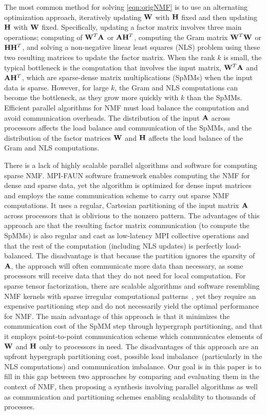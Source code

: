 The most common method for solving \cref{eqn:origNMF} is to use an alternating optimization approach, iteratively updating $\WW$ with $\HH$ fixed and then updating $\HH$ with $\WW$ fixed.
Specifically, updating a factor matrix involves three main operations; computing of $\WW^T\AA$ or $\AA\Hm^T$, computing the Gram matrix $\Wm^T \Wm$ or $\Hm \Hm^T$, and solving a non-negative linear least squares (NLS) problem using these two resulting matrices to update the factor matrix.
When the rank $k$ is small, the typical bottleneck is the computation that involves the input matrix, $\WW^T\AA$ and $\AA\Hm^T$, which are sparse-dense matrix multiplications (SpMMs) when the input data is sparse.
However, for large $k$, the Gram and NLS computations can become the bottleneck, as they grow more quickly with $k$ than the SpMMs.
Efficient parallel algorithms for NMF must load balance the computation and avoid communication overheads.
The distribution of the input $\AA$ across processors affects the load balance and communication of the SpMMs, and the distribution of the factor matrices $\WW$ and $\HH$ affects the load balance of the Gram and NLS computations.

There is a lack of highly scalable parallel algorithms and software for computing sparse NMF.
MPI-FAUN \cite{KBP17} software framework enables computing the NMF for dense and sparse data, yet the algorithm is optimized for dense input matrices and employs the same communication scheme to carry out sparse NMF computations.
It uses a regular, Cartesian partitioning of the input matrix $\AA$ across processors that is oblivious to the nonzero pattern.
The advantages of this approach are that the resulting factor matrix communication (to compute the SpMMs) is also regular and cast as low-latency MPI collective operations and that the rest of the computation (including NLS updates) is perfectly load-balanced.
The disadvantage is that because the partition ignores the sparsity of $\AA$, the approach will often communicate more data than necessary, as some processors will receive data that they do not need for local computation.
For sparse tensor factorization, there are scalable algorithms and software resembling NMF kernels with sparse irregular computational patterns~\cite{KU15}, yet they require an expensive partitioning step and do not necessarily yield the optimal performance for NMF.
The main advantage of this approach is that it minimizes the communication cost of the SpMM step through hypergraph partitioning, and that it employs point-to-point communication scheme which communicates elements of $\WW$ and $\HH$ only to processors in need.
The disadvantages of this approach are an upfront hypergraph partitioning cost, possible load imbalance~(particularly in the NLS computations) and communication imbalance.
Our goal is in this paper is to fill in this gap between two approaches by comparing and evaluating them in the context of NMF, then proposing a synthesis involving parallel algorithms as well as communication and partitioning schemes enabling scalability to thousands of processes.

